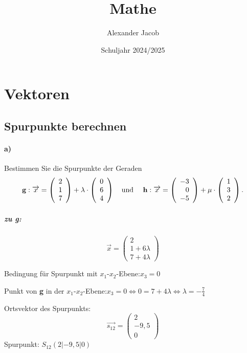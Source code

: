 \documentclass{ajc}
\title{Mathe}
\author{Alexander Jacob}
\date{Schuljahr 2024/2025}
\numberwithin{equation}{subsection}
\begin{document}
	\section{Vektoren}
	
	\subsection{Spurpunkte berechnen}
	\paragraph{a)} Bestimmen Sie die Spurpunkte der Geraden
	\begin{equation}
		\mathbf{g}: \overrightarrow{x}=\left(\begin{array}{r} 2 \\ 1 \\ 7\end{array}\right) + \lambda \cdot \left(\begin{array}{r} 0 \\ 6 \\ 4\end{array}\right) \text{\quad und \quad} \mathbf{h}: \overrightarrow{x}=\left(\begin{array}{r} -3 \\ 0 \\ -5\end{array}\right) + \mu \cdot \left(\begin{array}{r} 1 \\ 3 \\ 2\end{array}\right). 
	\end{equation}
	
	\subparagraph{zu g:}
	\begin{equation}
		\overrightarrow{x}=\left(\begin{array}{r} 2 \\ 1 + 6\lambda \\ 7 + 4\lambda \end{array}\right)
	\end{equation}
	
	Bedingung für Spurpunkt mit $x_1\text{-}x_2$-Ebene:\quad $x_3 = 0$
	
	Punkt von \textbf{g} in der $x_1\text{-}x_2$-Ebene:\quad $x_3 = 0 \Leftrightarrow 0 = 7 + 4\lambda \Leftrightarrow \lambda = -\frac{7}{4}$
	
	Ortsvektor des Spurpunkts: 
	\begin{equation}
	\overrightarrow{s_\text{12}}=\left(\begin{array}{r} 2 \\ -9,5 \\ 0\end{array}\right)
	\end{equation}
	Spurpunkt: $S_\text{12}(2|-9,5|0)$
	
\end{document}
